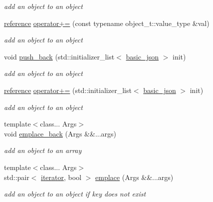 \begin{DoxyCompactItemize}
\begin{DoxyCompactList}\small\item\em add an object to an object \end{DoxyCompactList}\item 
\hyperlink{classnlohmann_1_1basic__json_a3ec8e17be8732fe436e9d6733f52b7a3}{reference} \hyperlink{classnlohmann_1_1basic__json_a9486a272e034c0548305d7a12f3045e6}{operator+=} (const typename object\+\_\+t\+::value\+\_\+type \&val)
\begin{DoxyCompactList}\small\item\em add an object to an object \end{DoxyCompactList}\item 
void \hyperlink{classnlohmann_1_1basic__json_a9c9b4932b26a9630e1a3f25ea42a2c43}{push\+\_\+back} (std\+::initializer\+\_\+list$<$ \hyperlink{classnlohmann_1_1basic__json}{basic\+\_\+json} $>$ init)
\begin{DoxyCompactList}\small\item\em add an object to an object \end{DoxyCompactList}\item 
\hyperlink{classnlohmann_1_1basic__json_a3ec8e17be8732fe436e9d6733f52b7a3}{reference} \hyperlink{classnlohmann_1_1basic__json_aa0033766b4d3134b9bb57d81762d75a2}{operator+=} (std\+::initializer\+\_\+list$<$ \hyperlink{classnlohmann_1_1basic__json}{basic\+\_\+json} $>$ init)
\begin{DoxyCompactList}\small\item\em add an object to an object \end{DoxyCompactList}\item 
{\footnotesize template$<$class... Args$>$ }\\void \hyperlink{classnlohmann_1_1basic__json_a0b059e0a80dddc705e93fd145a015058}{emplace\+\_\+back} (Args \&\&...args)
\begin{DoxyCompactList}\small\item\em add an object to an array \end{DoxyCompactList}\item 
{\footnotesize template$<$class... Args$>$ }\\std\+::pair$<$ \hyperlink{classnlohmann_1_1basic__json_ae3c77a8f03096da2a32a3de0c317d445}{iterator}, bool $>$ \hyperlink{classnlohmann_1_1basic__json_a6aad9abff425c8c49daa46f8de67965f}{emplace} (Args \&\&...args)
\begin{DoxyCompactList}\small\item\em add an object to an object if key does not exist \end{DoxyCompactList}\item 

\end{DoxyCompactItemize}
